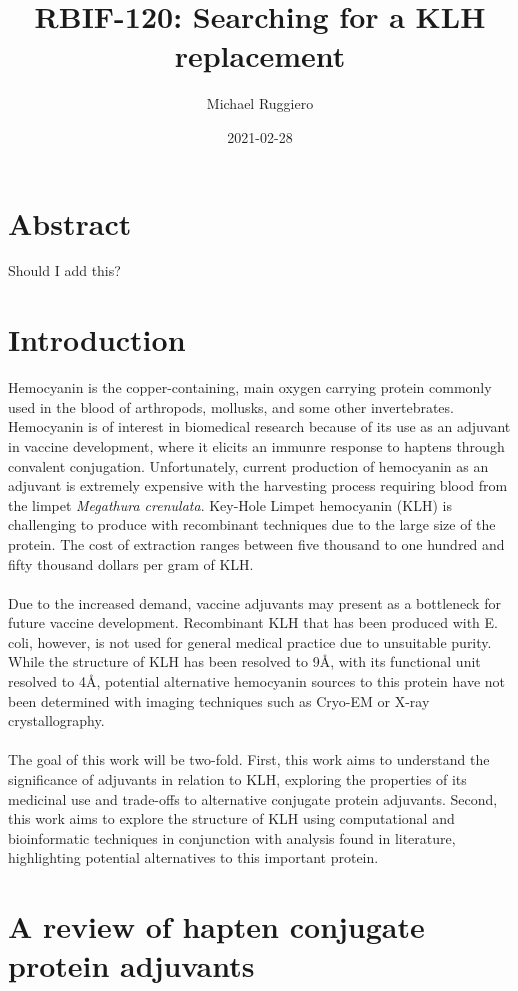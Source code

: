 \documentclass[a4paper]{article}
\title{RBIF-120: Searching for a KLH replacement}
\author{Michael Ruggiero}
\date{2021-02-28}
\begin{document}
\maketitle
\clearpage

\section{Abstract}
Should I add this?
\section{Introduction}
Hemocyanin is the copper-containing, main oxygen carrying protein commonly used in the blood of arthropods, mollusks, and some other invertebrates. Hemocyanin is of interest in biomedical research because of its use as an adjuvant in vaccine development, where it elicits an immunre response to haptens through convalent conjugation. Unfortunately, current production of hemocyanin as an adjuvant is extremely expensive with the harvesting process requiring blood from the limpet \emph{Megathura crenulata}. Key-Hole Limpet hemocyanin (KLH) is challenging to produce with recombinant techniques due to the large size of the protein. The cost of extraction ranges between five thousand to one hundred and fifty thousand dollars per gram of KLH.   \\\\
Due to the increased demand, vaccine adjuvants may present as a bottleneck for future vaccine development. Recombinant KLH that has been produced with E. coli, however, is not used for general medical practice due to unsuitable purity. While the structure of KLH has been resolved to 9\AA , with its functional unit resolved to 4\AA, potential alternative hemocyanin sources to this protein have not been determined with imaging techniques such as Cryo-EM or X-ray crystallography. \\\\
The goal of this work will be two-fold.  First, this work aims to understand the significance of adjuvants in relation to KLH, exploring the properties of its medicinal use and trade-offs to alternative conjugate protein adjuvants. Second, this work aims to explore the structure of KLH using computational and bioinformatic techniques in conjunction with analysis found in literature, highlighting potential alternatives to this important protein. 

\section{A review of hapten conjugate protein adjuvants}
\end{document}
